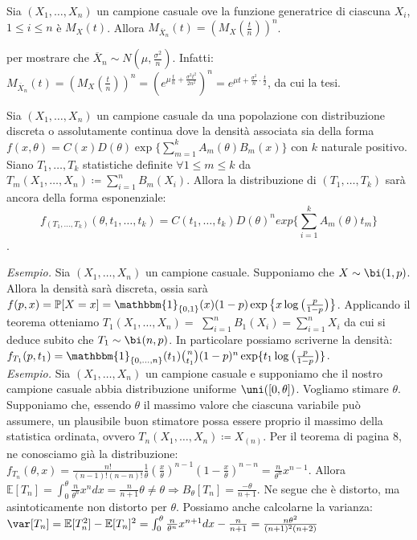 \begin{theorem}
Sia $(X_1,\ldots,X_n)$ un campione casuale ove la funzione generatrice di ciascuna $X_i$, $1\leq i\leq n$ è $M_{X}(t)$. Allora $M_{\overline{X}_n}(t)=(M_{X}(\frac{t}{n}))^n$.
\end{theorem}
per mostrare che $\overline{X}_n\sim N(\mu, \frac{\sigma^2}{n})$. Infatti: \\ 
$M_{\overline{X}_n}(t)=(M_{X}(\frac{t}{n}))^n=\left(e^{\mu\frac{t}{n}+\frac{\sigma^2 t^2}{2n^2}}\right)^n=e^{\mu t+\frac{\sigma^2}{n}\cdot\frac{t}{2}}$, da cui la tesi. \\

\begin{theorem}
Sia $(X_1,\ldots,X_n)$ un campione casuale da una popolazione con distribuzione discreta o assolutamente continua dove la densità associata sia della forma $f(x,\theta)=C(x)D(\theta)\exp\{\sum_{m=1}^k A_m(\theta)B_m(x)\}$ con $k$ naturale positivo. Siano $T_1,\ldots,T_k$ statistiche definite $\forall 1\leq m\leq k$ da $T_m(X_1,\ldots,X_n)\coloneqq \sum_{i=1}^n B_m(X_i)$. Allora la distribuzione di $(T_1,\ldots,T_k)$ sarà ancora della forma esponenziale:
$$f_{(T_1,\ldots,T_k)}(\theta,t_1,\ldots,t_k)=C(t_1,\ldots,t_k)D(\theta)^n exp\bigg\{\sum_{i=1}^k A_m(\theta)t_m\bigg\}$$.
\end{theorem}
\textit{Esempio.} Sia $(X_1,\ldots,X_n)$ un campione casuale. Supponiamo che $X\sim \bi(1,p)$. Allora la densità sarà discreta, ossia sarà $f(p,x)=\mathbb{P}[X=x]=\mathbbm{1}_{\{0,1\}}(x)(1-p)\exp\big\{x \log\big(\frac{p}{1-p}\big)\big\}$. Applicando il teorema otteniamo $T_1(X_1,\ldots,X_n)=$ $\sum_{i=1}^n B_1(X_i)=\sum_{i=1}^n X_i$ da cui si deduce subito che $T_1\sim \bi(n,p)$. In particolare possiamo scriverne la densità: $f_{T_1}(p,t_1)=\mathbbm{1}_{\{0,\ldots,n\}}(t_1)\binom{n}{t_1}(1-p)^n\exp\{t_1 \log\big(\frac{p}{1-p}\big)\}$. \\ \textit{Esempio.} Sia $(X_1,\ldots,X_n)$ un campione casuale e supponiamo che il nostro campione casuale abbia distribuzione uniforme $\uni([0,\theta])$. Vogliamo stimare $\theta$. Supponiamo che, essendo $\theta$ il massimo valore che ciascuna variabile può assumere, un plausibile buon stimatore possa essere proprio il massimo della statistica ordinata, ovvero $T_n(X_1,\ldots,X_n)\coloneqq X_{(n)}$. Per il teorema di pagina 8, ne conosciamo già la distribuzione: $f_{T_n}(\theta,x)=\frac{n!}{(n-1)!(n-n)!}\frac{1}{\theta}\left(\frac{x}{\theta}\right)^{n-1}\left(1-\frac{x}{\theta}\right)^{n-n}=\frac{n}{\theta^n}x^{n-1}$. Allora $\mathbb{E}[T_n]=\int_0^\theta \frac{n}{\theta^n}x^n dx=\frac{n}{n+1}\theta \neq \theta\Longrightarrow B_{\theta}[T_n]=\frac{-\theta}{n+1}$. Ne segue che è distorto, ma asintoticamente non distorto per $\theta$. Possiamo anche calcolarne la varianza: $\var[T_n]=\mathbb{E}[T_n^2]-\mathbb{E}[T_n]^2=\int_0^\theta \frac{n}{\theta^n}x^{n+1} dx -\frac{n}{n+1}=\frac{n\theta^2}{(n+1)^2(n+2)}$

